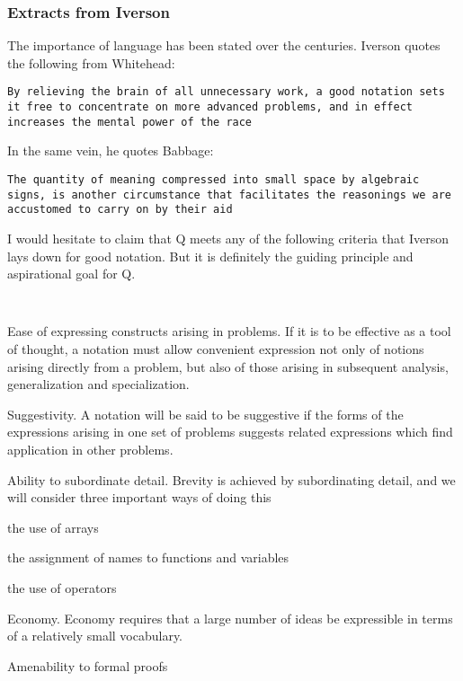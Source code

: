 \subsubsection{Extracts from Iverson}

The importance of language has been stated over the centuries. Iverson
quotes the following from Whitehead:

{\tt By relieving the brain of all unnecessary work, a good notation
  sets it free to concentrate on more advanced problems, and in effect
    increases the mental power of the race}

In the same vein, he quotes Babbage:

{\tt The quantity of meaning compressed into small space by algebraic
  signs, is another circumstance that facilitates the reasonings we are
    accustomed to carry on by their aid}

I would hesitate to claim that Q meets any of the following criteria
that Iverson lays down for good notation. But it is  definitely the
guiding principle and aspirational goal for Q.

{\tt 
\be
\item Ease of expressing constructs arising in problems. If it is to be
effective as a tool of thought, a notation must allow convenient
expression not only of notions arising directly from a problem, but also
of those arising in subsequent analysis, generalization and
specialization.

\item Suggestivity. A notation will be said to be suggestive if the
forms of the expressions arising in one set of problems suggests related
expressions which find application in other problems.

\item Ability to subordinate detail. Brevity is achieved by
subordinating detail, and we will consider three important ways of doing
this
\bi
\item the use of arrays
\item the assignment of names to functions and variables
\item the use of operators
\ei

\item Economy. Economy requires that a large number of ideas be
expressible in terms of a relatively small vocabulary. 

\item Amenability to formal proofs

\ee
}

